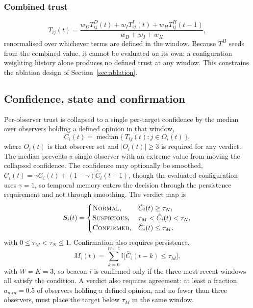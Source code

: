 \subsubsection{Combined trust}

\begin{equation}
\label{eq:combined}
T_{ij}(t) = \frac{w_D T^D_{ij}(t) + w_I T^I_{ij}(t) + w_H T^H_{ij}(t-1)}{w_D + w_I + w_H},
\end{equation}
renormalised over whichever terms are defined in the window. Because $T^H$
seeds from the combined value, it cannot be evaluated on its own: a
configuration weighting history alone produces no defined trust at any window.
This constrains the ablation design of Section~\ref{sec:ablation}.

\subsection{Confidence, state and confirmation}

Per-observer trust is collapsed to a single per-target confidence by the median
over observers holding a defined opinion in that window,
\begin{equation}
\label{eq:median}
C_i(t) = \operatorname{median}\{\, T_{ij}(t) : j \in O_i(t) \,\},
\end{equation}
where $O_i(t)$ is that observer set and $|O_i(t)| \ge 3$ is required for any
verdict. The median prevents a single observer with an extreme value from
moving the collapsed confidence. The confidence may optionally be smoothed,
$\hat C_i(t) = \gamma C_i(t) + (1-\gamma)\hat C_i(t-1)$, though the evaluated
configuration uses $\gamma = 1$, so temporal memory enters the decision through
the persistence requirement and not through smoothing. The verdict map is
\begin{equation}
\label{eq:verdict}
S_i(t) =
\begin{cases}
\textsc{Normal}, & \hat C_i(t) \ge \tau_N,\\
\textsc{Suspicious}, & \tau_M < \hat C_i(t) < \tau_N,\\
\textsc{Confirmed}, & \hat C_i(t) \le \tau_M,
\end{cases}
\end{equation}
with $0 \le \tau_M < \tau_N \le 1$. Confirmation also requires
persistence,
\begin{equation}
\label{eq:persist}
M_i(t) = \sum_{k=0}^{W-1} \mathbb{I}\bigl[\hat C_i(t-k) \le \tau_M\bigr],
\end{equation}
with $W = K = 3$, so beacon $i$ is confirmed only if the three most recent
windows all satisfy the condition. A verdict also requires agreement: at
least a fraction $a_{min} = 0.5$ of observers holding a defined opinion, and no
fewer than three observers, must place the target below $\tau_M$ in the same
window.

